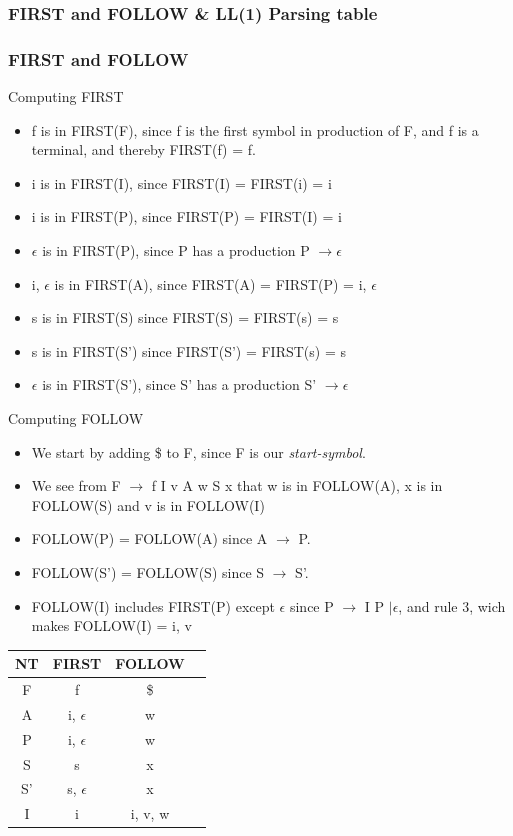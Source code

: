 \documentclass{article}
\begin{document}
\subsubsection{{\ttfamily FIRST} and {\ttfamily FOLLOW} \& LL(1) Parsing table}
\subsubsection*{{\ttfamily FIRST} and {\ttfamily FOLLOW}}
Computing {\ttfamily FIRST}
\begin{itemize}
  \item f is in FIRST(F), since f is the first symbol in production of F, and f
  is a terminal, and thereby FIRST(f) = f.
  \item i is in FIRST(I), since FIRST(I) = FIRST(i) = i
  \item i is in FIRST(P), since FIRST(P) = FIRST(I) = i 
  \item $\epsilon$ is in FIRST(P), since P has a production P $\rightarrow
  \epsilon$
  \item i, $\epsilon$ is in FIRST(A), since FIRST(A) = FIRST(P) = i, $\epsilon$
  \item s is in FIRST(S) since FIRST(S) = FIRST(s) = s 
  \item s is in FIRST(S') since FIRST(S') = FIRST(s) = s 
  \item $\epsilon$ is in FIRST(S'), since S' has a production S' $\rightarrow
  \epsilon$
\end{itemize}
Computing {\ttfamily FOLLOW}
\begin{itemize}
  \item We start by adding \$ to F, since F is our \emph{start-symbol}.
  \item We see from F $\rightarrow$ f I v A w S x that w is in FOLLOW(A), x
  is in FOLLOW(S) and v is in FOLLOW(I)
  \item FOLLOW(P) = FOLLOW(A) since A $\rightarrow$ P. 
  \item FOLLOW(S') = FOLLOW(S) since S $\rightarrow$ S'.
  \item FOLLOW(I) includes FIRST(P) except $\epsilon$ since P $\rightarrow$ I P
  $| \epsilon$, and rule 3, wich makes FOLLOW(I) = i, v
\end{itemize}
\begin{tabular}{|c|c|c|c|}
\hline
NT & FIRST & FOLLOW \\
\hline
\hline
F  & f & \$ \\
A  & i, $\epsilon$ & w \\
P  & i, $\epsilon$ & w \\
S  & s & x \\
S' & s, $\epsilon$ & x \\
I  & i & i, v, w \\
\hline
\end{tabular}
\end{document}
